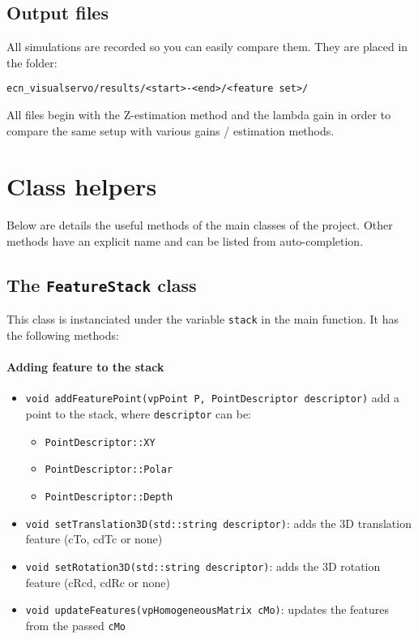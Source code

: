 \documentclass{ecnreport}
\begin{document}
\subsection{Output files}

All simulations are recorded so you can easily compare them. They are placed in the folder:
\begin{center}
 \texttt{ecn\_visualservo/results/<start>-<end>/<feature set>/}
\end{center}
All files begin with the Z-estimation method and the lambda gain in order to compare the same setup with various gains / estimation methods.



\newpage
\appendix

\section{Class helpers}

Below are details the useful methods of the main classes of the project. Other methods have an explicit name and can be listed from auto-completion.

\subsection{The \texttt{FeatureStack} class}\label{app:stack}

This class is instanciated under the variable \texttt{stack} in the main function. It has the following methods:
\paragraph{Adding feature to the stack}
\begin{itemize}
 \item  \texttt{void addFeaturePoint(vpPoint P, PointDescriptor descriptor)}
 add a point to the stack, where \texttt{descriptor} can be:
 \begin{itemize}
  \item \texttt{PointDescriptor::XY}
  \item \texttt{PointDescriptor::Polar}
  \item \texttt{PointDescriptor::Depth}
 \end{itemize}
  \item  \texttt{void setTranslation3D(std::string descriptor)}: adds the 3D translation feature (cTo, cdTc or none)
  \item  \texttt{void setRotation3D(std::string descriptor)}: adds the 3D rotation feature (cRcd, cdRc or none)
  \item  \texttt{void updateFeatures(vpHomogeneousMatrix cMo)}: updates the features from the passed \texttt{cMo}
\end{itemize}
\end{document}
